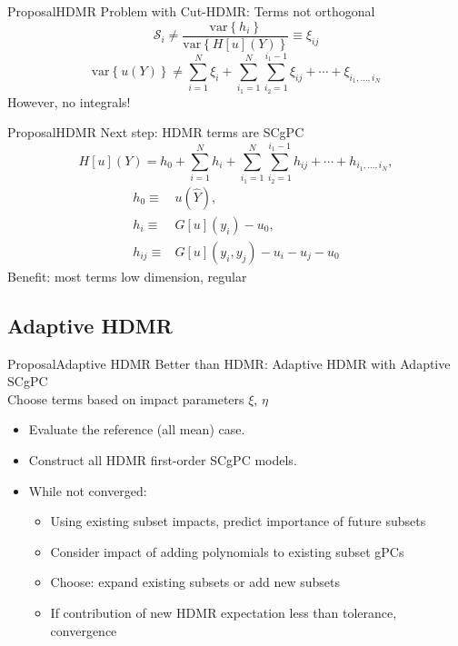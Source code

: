 \documentclass{beamer}
\begin{document}
\begin{frame}{Proposal}{HDMR}\vspace{-20pt}
  Problem with Cut-HDMR: Terms not orthogonal
  \begin{equation*}
    \mathcal{S}_i \neq \frac{\text{var}\left\{h_i\right\}}{\text{var}\left\{H[u](Y)\right\}}\equiv\xi_{ij} 
  \end{equation*}
  \begin{equation*}
    \text{var}\left\{u(Y)\right\}\neq \sum_{i=1}^N \xi_i + \sum_{i_1=1}^N\sum_{i_2=1}^{i_1-1}
         \xi_{ij}+\cdots+\xi_{i_1,\ldots,i_N}
  \end{equation*}
  However, no integrals!
\end{frame}

\begin{frame}{Proposal}{HDMR}\vspace{-20pt}
  Next step: HDMR terms are SCgPC
  \begin{equation*}
  H[u](Y) = h_0 + \sum_{i=1}^N h_i + \sum_{i_1=1}^N\sum_{i_2=1}^{i_1-1}h_{ij}+\cdots +
      h_{i_1,\ldots,i_N},
  \end{equation*}
  \begin{align*}
    h_0 \equiv& u(\hat Y), \\
    h_i \equiv& G[u](y_i) - u_0, \\
    h_{ij} \equiv& G[u](y_i,y_j) -u_i - u_j - u_0
  \end{align*}
  Benefit: most terms low dimension, regular
\end{frame}

\subsection{Adaptive HDMR}
\begin{frame}{Proposal}{Adaptive HDMR}\vspace{-20pt}
  Better than HDMR: Adaptive HDMR with Adaptive SCgPC\\
  Choose terms based on impact parameters $\xi$, $\eta$
\begin{itemize}
  \item Evaluate the reference (all mean) case.
  \item Construct all HDMR first-order SCgPC models.
  \item While not converged:
  \begin{itemize}
    \item Using existing subset impacts, predict importance of future subsets
    \item Consider impact of adding polynomials to existing subset gPCs
    \item Choose: expand existing subsets or add new subsets
    \item If contribution of new HDMR expectation less than tolerance, convergence
  \end{itemize}
\end{itemize}
\end{frame}
\end{document}
